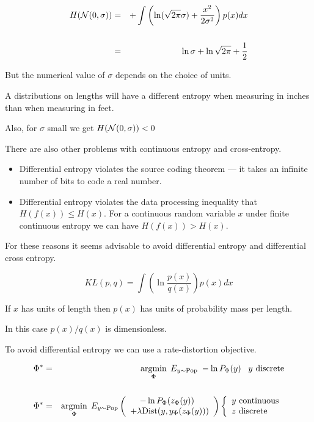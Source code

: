 {

\begin{eqnarray*}
  H({\cal N}(0,\sigma)) & = &  + \int \left( \ln(\sqrt{2\pi} \sigma) + \frac{x^2}{2\sigma^2}\right) p(x) dx \\
  \\
  & = & \ln \sigma + \ln \sqrt{2\pi} + \frac{1}{2}
\end{eqnarray*}

But the numerical value of $\sigma$ depends on the choice of units.

\vfill A distributions on lengths will have a different entropy
when measuring in inches than when measuring in feet.

\vfill
Also, for $\sigma$ small we get $H({\cal N}(0,\sigma)) < 0$

\vfill


There are also other problems with continuous entropy and cross-entropy.

\vfill
\begin{itemize}
\item Differential entropy violates the source coding theorem --- it takes an infinite number of bits to code a real number.

\vfill
\item Differential entropy violates the data processing inequality that $H(f(x)) \leq H(x)$.  For a continuous random variable $x$ under finite continuous entropy we can have $H(f(x)) > H(x)$.
\end{itemize}

\vfill
For these reasons it seems advisable to avoid differential entropy and differential cross entropy.


$$KL(p,q) = \int \left( \ln \frac{p(x)}{q(x)}\right) p(x) dx$$

\vfill
If $x$ has units of length then $p(x)$ has units of probability mass per length.

\vfill
In this case $p(x)/q(x)$ is dimensionless.



To avoid differential entropy we can use a rate-distortion objective.

\vfill
{\color{red}
\begin{eqnarray*}
\Phi^* & = & \operatorname*{argmin}_\Phi \;E_{y \sim \mathrm{Pop}} \;-\ln P_\Phi(y)\;\;\;\mbox{$y$ discrete} \\
\\
\Phi^* & = & \operatorname*{argmin}_\Phi \;E_{y \sim \mathrm{Pop}}\left(\begin{array}{l}\;\;\;\;-\ln P_\Phi(z_\Phi(y)) \\ + \lambda \mathrm{Dist}(y,y_\Phi(z_\Phi(y)))\end{array}\right)
\left\{\begin{array}{l}\mbox{$y$ continuous} \\ \mbox{$z$ discrete}\end{array}\right.
\end{eqnarray*}
}

}
